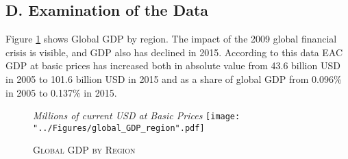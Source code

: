 \documentclass[a4paper]{article}
\begin{document}

\newpage

\subsection*{D. Examination of the Data}
\setcounter{table}{0}
\renewcommand{\thetable}{D\arabic{table}}
\setcounter{figure}{0}
\renewcommand{\thefigure}{D\arabic{figure}}

Figure \ref{fig:wld_GDP_reg} shows Global GDP by region. The impact of the 2009 global financial crisis is visible, and GDP also has declined in 2015. %
According to this data EAC GDP at basic prices has increased both in absolute value from 43.6 billion USD in 2005 to 101.6 billion USD in 2015 and as a share of global GDP from 0.096\% in 2005 to 0.137\% in 2015. \newline

\begin{figure}[h!] \vspace{-6mm}
\centering
\caption{\label{fig:wld_GDP_reg}\textsc{Global GDP by Region}}
\small{\textit{Millions of current USD at Basic Prices}}
\texttt{[image: "../Figures/global\_GDP\_region".pdf]} %
\vspace{-8mm}
\end{figure}
\FloatBarrier
\end{document}
